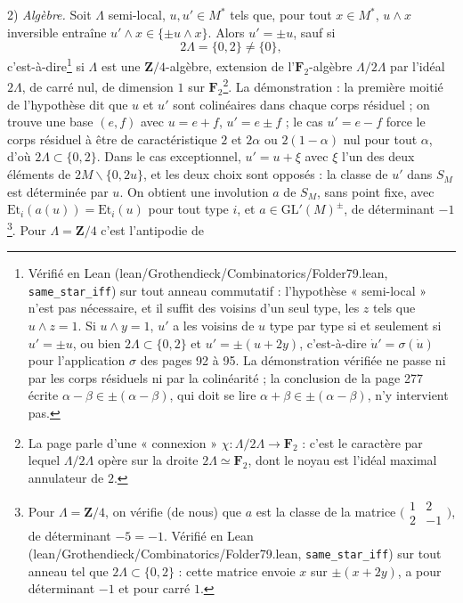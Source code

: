 \documentclass[11pt,a4paper]{article}
\begin{document}
2) \emph{Algèbre.} Soit $\Lambda$ semi-local, $u, u' \in M^{*}$ tels que, pour
tout $x \in M^{*}$, $u \wedge x$ inversible entraîne $u' \wedge x \in \{\pm u
\wedge x\}$. Alors $u' = \pm u$, sauf si
\[
  2\Lambda = \{0, 2\} \neq \{0\} ,
\]
c'est-à-dire\footnote{Vérifié en Lean (lean/Grothendieck/Combinatorics/Folder79.lean,
\texttt{same\_star\_iff}) sur tout anneau commutatif : l'hypothèse
« semi-local » n'est pas nécessaire, et il suffit des voisins d'un seul type,
les $z$ tels que $u \wedge z = 1$. Si $u \wedge y = 1$, $u'$ a les voisins de
$u$ type par type si et seulement si $u' = \pm u$, ou bien $2\Lambda \subset
\{0, 2\}$ et $u' = \pm(u + 2y)$, c'est-à-dire $\dot u' = \sigma(\dot u)$
pour l'application $\sigma$ des pages 92 à 95. La démonstration vérifiée ne
passe ni par les corps résiduels ni par la colinéarité ; la conclusion de la
page 277 écrite $\alpha - \beta \in \pm(\alpha - \beta)$, qui doit se lire
$\alpha + \beta \in \pm(\alpha - \beta)$, n'y intervient pas.} si $\Lambda$ est une $\mathbf{Z}/4$-algèbre, extension de
l'$\mathbf{F}_2$-algèbre $\Lambda/2\Lambda$ par l'idéal $2\Lambda$, de carré
nul, de dimension $1$ sur $\mathbf{F}_2$\footnote{La page parle d'une
« connexion » $\chi : \Lambda/2\Lambda \to \mathbf{F}_2$ : c'est le caractère par
lequel $\Lambda/2\Lambda$ opère sur la droite $2\Lambda \simeq \mathbf{F}_2$, dont
le noyau est l'idéal maximal annulateur de $2$.}. La démonstration : la
première moitié de l'hypothèse dit que $u$ et $u'$ sont colinéaires dans chaque
corps résiduel ; on trouve une base $(e, f)$ avec $u = e + f$, $u' = e \pm f$ ;
le cas $u' = e - f$ force le corps résiduel à être de caractéristique $2$ et
$2\alpha$ ou $2(1 - \alpha)$ nul pour tout $\alpha$, d'où $2\Lambda \subset \{0,
2\}$. Dans le cas exceptionnel, $u' = u + \xi$ avec $\xi$ l'un des deux éléments
de $2M \smallsetminus \{0, 2u\}$, et les deux choix sont opposés : la classe de
$u'$ dans $S_M$ est déterminée par $u$. On obtient une involution $a$ de $S_M$,
sans point fixe, avec $\mathrm{Et}_i(a(u)) = \mathrm{Et}_i(u)$ pour tout type
$i$, et $a \in \mathrm{GL}'(M)^{\pm}$, de déterminant $-1$\footnote{Pour
$\Lambda = \mathbf{Z}/4$, on vérifie (de nous) que $a$ est la classe de la
matrice $\bigl(\begin{smallmatrix} 1 & 2 \\ 2 & -1 \end{smallmatrix}\bigr)$, de
déterminant $-5 = -1$. Vérifié en Lean (lean/Grothendieck/Combinatorics/Folder79.lean,
\texttt{same\_star\_iff}) sur tout anneau tel que $2\Lambda \subset \{0,
2\}$ : cette matrice envoie $x$ sur $\pm(x + 2y)$, a pour déterminant $-1$ et
pour carré $1$.}. Pour $\Lambda = \mathbf{Z}/4$ c'est l'antipodie de
\end{document}
